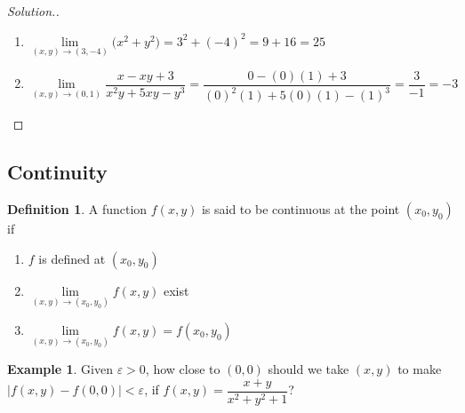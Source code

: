 \documentclass[11pt,a4paper]{article}
\theoremstyle{definition}
\newtheorem{defn}[thm]{Definition}
\newtheorem{exa}[thm]{Example}
\newenvironment{solution}
  {\renewcommand{\qedsymbol}{}\begin{proof}[\textit{Solution}.]}
  {\end{proof}}
\begin{document}
\begin{solution}
\begin{enumerate}
\item $\lim\limits_{(x,y) \rightarrow (3,-4)}\Big(x^2 + y^2 \Big) = 3^2 + (-4)^2 = 9 + 16 = 25$

\item $\lim\limits_{(x,y) \rightarrow (0,1)}\dfrac{x - xy + 3}{x^2y + 5xy - y^3} = \dfrac{0 - (0)(1) + 3}{(0)^2 (1) + 5(0)(1) - (1)^3} = \dfrac{3}{-1} = -3$
\end{enumerate}
\end{solution}

\subsection{Continuity}

\begin{defn}


A function $f(x,y)$ is said to be continuous at the point $(x_0,y_0)$ if 
\begin{enumerate}
\item $f$ is defined at $(x_0,y_0)$
\item $\displaystyle{ \lim\limits_{(x,y) \rightarrow (x_0,y_0)}f(x,y)}$ exist

\item $\lim\limits_{(x,y) \rightarrow (x_0,y_0)}f(x,y) = f(x_0,y_0)$
\end{enumerate}
\end{defn}

\begin{exa}


Given $\varepsilon > 0$, how close to $(0,0)$ should we take $(x,y)$ to make $\left|f(x,y) - f(0,0)\right| < \varepsilon$, if $f(x,y) = \dfrac{x + y }{x^2 + y^2 + 1}$?\\
\end{exa}
\end{document}
